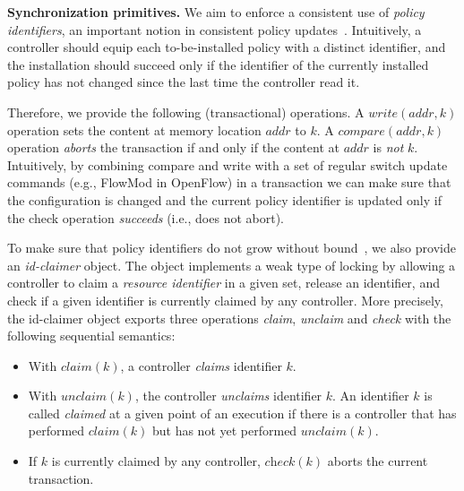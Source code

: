 \documentclass[conference]{sigcomm-alternate}
\newcommand{\Nat}{\mathbb{N}}
\newcommand{\claimcheck}{check\xspace}
\newcommand{\compare}{compare\xspace}
\newcommand{\addr}{\textit{addr}\xspace}
\begin{document}
\vspace{1mm}
\noindent\textbf{Synchronization primitives.}
%
We aim to enforce a consistent use of  \emph{policy identifiers},
an important notion in consistent policy updates~\cite{network-update,stn}.
Intuitively, a controller should
equip each to-be-installed policy with a distinct
identifier,
and the installation should succeed only if the identifier of the
currently installed policy has not changed since the last time the
controller read it.

Therefore, we provide the following (transactional) operations.
A $\textit{write}(\addr,k)$ operation sets the content at memory location
$\addr$ to $k$.
A $\textit{\compare}(\addr,k)$ operation \emph{aborts} the transaction
if and only if the content at
$\addr$ is \emph{not} $k$.
Intuitively, by combining compare and write with a set of regular
switch update commands (e.g., FlowMod in OpenFlow) 
in a transaction  we can make sure that the
configuration is changed and the current policy identifier is updated
only if the check operation \emph{succeeds} (i.e., does not abort).

To make sure that policy identifiers do not grow without bound~\cite{stn}, we
also provide an \emph{id-claimer} object.
The object implements a weak type
of locking by allowing a controller to claim a \emph{resource identifier} in a
given set, release an identifier,  and check if a given identifier
is currently claimed by any controller.
More precisely, the id-claimer object exports three operations \emph{claim},
\emph{unclaim} and \emph{\claimcheck} with the following sequential
semantics:

\begin{itemize}
\item With $\textit{claim}(k)$,
a controller %
\emph{claims}  identifier $k$.

\item With $\textit{unclaim}(k)$, %
the controller %
  \emph{unclaims} identifier $k$.
An identifier $k$ is called \emph{claimed} at a given point of an
execution if there is a controller that has performed $\textit{claim}(k)$
but has not yet performed  $\textit{unclaim}(k)$.

\item If $k$ is currently claimed by any controller,
$\textit{\claimcheck}(k)$ %
aborts the current transaction.

\end{itemize}
\end{document}
